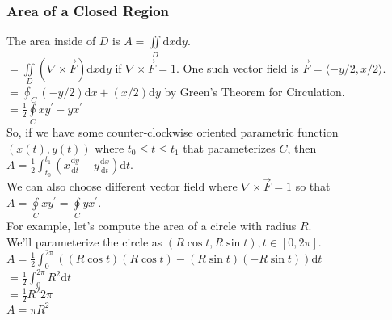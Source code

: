 \subsubsection{Area of a Closed Region}
\noindent
The area inside of $D$ is $A = \iint\limits_{D}{\mathrm{d}x\mathrm{d}y}$.\\
$= \iint\limits_{D}{\left(\nabla \times \vec{F}\right)\mathrm{d}x\mathrm{d}y}$ if $\nabla \times \vec{F} = 1$. One such vector field is $\vec{F} = \langle -y/2, x/2 \rangle$.\\
$= \oint_{C}{(-y/2)\mathrm{d}x + (x/2)\mathrm{d}y}$ by Green's Theorem for Circulation.\\
$= \frac{1}{2}\oint\limits_{C}{xy^\prime - yx^\prime}$\\
So, if we have some counter-clockwise oriented parametric function $(x(t), y(t))$ where $t_0 \leq t \leq t_1$ that parameterizes $C$, then $A = \frac{1}{2}\int_{t_0}^{t_1}{\left(x\frac{\mathrm{d}y}{\mathrm{d}t} - y\frac{\mathrm{d}x}{\mathrm{d}t}\right)\mathrm{d}t}$.\\

\noindent
We can also choose different vector field where $\nabla \times \vec{F} = 1$ so that\\ $ A = \oint\limits_{C}{xy^\prime} = \oint\limits_{C}{yx^\prime}$.\\

\noindent
For example, let's compute the area of a circle with radius $R$.\\
\indent
We'll parameterize the circle as $(R\cos{t}, R\sin{t}), t \in [0,2\pi]$.\\
\indent
$A = \frac{1}{2}\int_{0}^{2\pi}{((R\cos{t})(R\cos{t}) - (R\sin{t})(-R\sin{t}))\mathrm{d}t}$\\
\indent
$= \frac{1}{2}\int_{0}^{2\pi}{R^2\mathrm{d}t}$\\
\indent
$= \frac{1}{2}R^2 2\pi$\\
\indent
$A = \pi R^2$